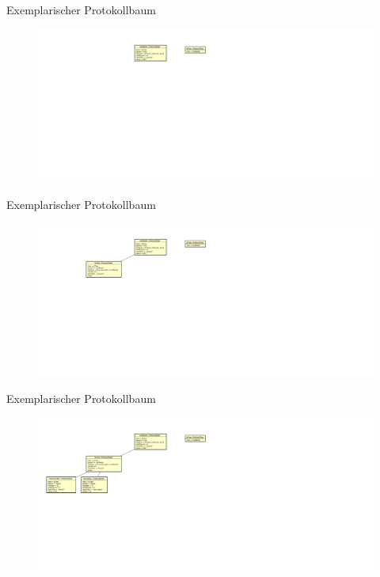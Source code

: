 \begin{frame}{Exemplarischer Protokollbaum}
    \begin{figure}
    	\centering
    	\includegraphics[width=\textwidth]{./images/prototree/9.pdf}
    \end{figure}
\end{frame}

\begin{frame}{Exemplarischer Protokollbaum}
    \begin{figure}
    	\centering
    	\includegraphics[width=\textwidth]{./images/prototree/8.pdf}
    \end{figure}
\end{frame}

\begin{frame}{Exemplarischer Protokollbaum}
    \begin{figure}
    	\centering
    	\includegraphics[width=\textwidth]{./images/prototree/7.pdf}
    \end{figure}
\end{frame}


